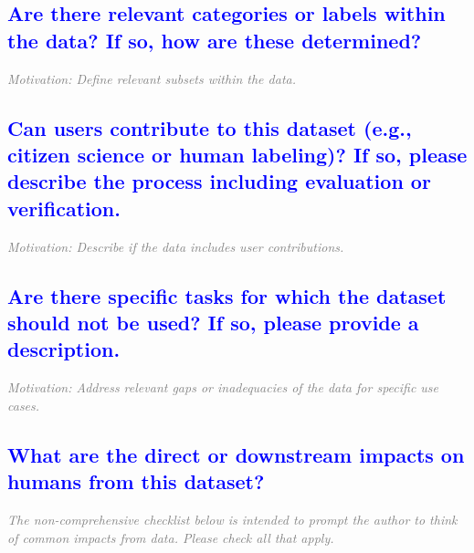 \documentclass[letterpaper, 10 pt, transmag]{IEEEtran}
\begin{document}
\textcolor{blue}{\subsection{Are there relevant categories or labels within the data? If so, how are these determined?}}
\textcolor{gray}{\textit{Motivation: Define relevant subsets within the data.}}

\textcolor{blue}{\subsection{Can users contribute to this dataset (e.g., citizen science or human labeling)? If so, please describe the process including evaluation or verification.}}
\textcolor{gray}{\textit{Motivation: Describe if the data includes user contributions.}}

\textcolor{blue}{\subsection{Are there specific tasks for which the dataset should not be used? If so,
please provide a description.}}
\textcolor{gray}{\textit{Motivation: Address relevant gaps or inadequacies of the data for specific use cases.}}

\textcolor{blue}{\subsection{What are the direct or downstream impacts on humans from this dataset?}}
\textcolor{gray}{\textit{The non-comprehensive checklist below is intended to prompt the author to think of common impacts from data. Please check all that apply.}}

\end{document}
